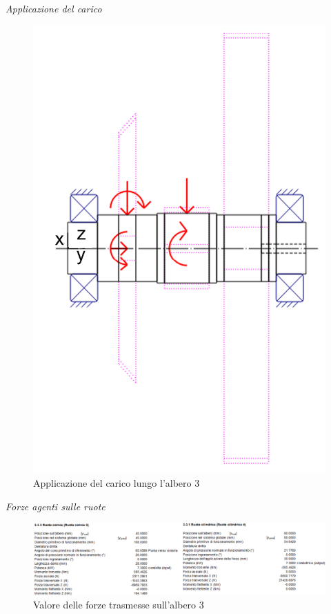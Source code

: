 \emph{Applicazione del carico}
\begin{figure}[h]
    \centering
    \includegraphics[scale=0.5]{Immagini/Carico1Albero3.png}
    \caption{Applicazione del carico lungo l'albero 3}
    \label{fig:Carico1Albero3}
\end{figure}
\newpage
\emph{Forze agenti sulle ruote}
\begin{figure}[h]
    \centering
    \includegraphics[scale=0.5]{Immagini/Forze1RuoteAlbero3.png}
    \caption{Valore delle forze trasmesse sull'albero 3}
    \label{fig:Forze1RuoteAlbero3}
\end{figure}

